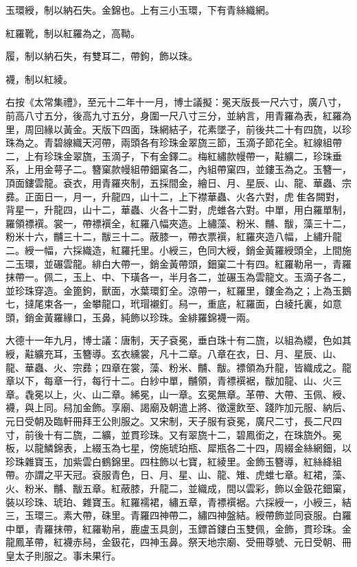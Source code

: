 \begin{pinyinscope}
 玉環綬，制以納石失。金錦也。上有三小玉環，下有青絲織網。



 紅羅靴，制以紅羅為之，高靿。



 履，制以納石失，有雙耳二，帶鉤，飾以珠。



 襪，制以紅綾。



 右按《太常集禮》，至元十二年十一月，博士議擬：冕天版長一尺六寸，廣八寸，前高八寸五分，後高九寸五分，身圍一尺八寸三分，並納言，用青羅為表，紅羅為里，周回緣以黃金。天版下四面，珠網結子，花素墜子，前後共二十有四旒，以珍珠為之。青碧線織天河帶，兩頭各有珍珠金翠旒三節，玉滴子節花全。紅線組帶二，上有珍珠金翠旒，玉滴子，下有金鐸二。梅紅繡款幔帶一，黈纊二，珍珠垂系，上用金萼子二。簪窠款幔組帶鈿窠各二，內組帶窠四，並鏤玉為之。玉簪一，頂面鏤雲龍。袞衣，用青羅夾制，五採間金，繪日、月、星辰、山、龍、華蟲、宗彞。正面日一，月一，升龍四，山十二，上下襟華蟲、火各六對，虎隹各闕對，背星一，升龍四，山十二，華蟲、火各十二對，虎蜼各六對。中單，用白羅單制，羅領褾襈。裳一，帶褾襈全，紅羅八幅夾造。上繡藻、粉米、黼、黻，藻三十二，粉米十六，黼三十二，黻三十二。蔽膝一，帶衣票襈，紅羅夾造八幅，上繡升龍二。綬一幅，六採織造，紅羅托里。小綬三，色同大綬，銷金黃羅綬頭全，上間施二玉環，並碾雲龍。緋白大帶一，銷金黃帶頭，鈿窠二十有四。紅羅勒帛一，青羅抹帶一。佩二，玉上、中、下璜各一，半月各二，並碾玉為雲龍文。玉滴子各二，並珍珠穿造。金篦鉤，獸面，水葉環釘全。涼帶一，紅羅里，鏤金為之；上為玉鵝七，撻尾束各一，金攀龍口，玳瑁襯釘。舄一，重底，紅羅面，白綾托裏，如意頭，銷金黃羅緣口，玉鼻，純飾以珍珠。金緋羅錦襪一兩。



 大德十一年九月，博士議：唐制，天子袞冕，垂白珠十有二旒，以組為纓，色如其綬，黈纊充耳，玉簪導。玄衣纁裳，凡十二章。八章在衣，日、月、星辰、山、龍、華蟲、火、宗彞；四章在裳，藻、粉米、黼、黻。褾領為升龍，皆織成之。龍章以下，每章一行，每行十二。白紗中單，黼領，青褾襈裾，黻加龍、山、火三章。毳冕以上，火、山二章。絺冕，山一章。玄冕無章。革帶、大帶、玉佩、綬、襪，與上同。舄加金飾。享廟、謁廟及朝遣上將、徵還飲至、踐阼加元服、納后、元日受朝及臨軒冊拜王公則服之。又宋制，天子服有袞冕，廣尺二寸，長二尺四寸，前後十有二旒，二纊，並貫珍珠。又有翠旒十二，碧鳳銜之，在珠旒外。冕板，以龍鱗錦表，上綴玉為七星，傍施琥珀瓶、犀瓶各二十四，周綴金絲網鈿，以珍珠雜寶玉，加紫雲白鶴錦里。四柱飾以七寶，紅綾里。金飾玉簪導，紅絲絳組帶。亦謂之平天冠。袞服青色，日、月、星、山、龍、雉、虎蜼七章。紅裙，藻、火、粉米、黼、黻五章。紅蔽膝，升龍二，並織成，間以雲彩，飾以金鈒花鈿窠，裝以珍珠、琥珀、雜寶玉。紅羅襦裙，繡五章，青褾襈裾。六採綬一，小綬三，結三，玉環三。素大帶，硃里。青羅四神帶二，繡四神盤結。綬帶飾並同袞服。白羅中單，青羅抹帶，紅羅勒帛，鹿盧玉具劍，玉鏢首鏤白玉雙佩，金飾，貫珍珠。金龍鳳革帶，紅襪赤舄，金鈒花，四神玉鼻。祭天地宗廟、受冊尊號、元日受朝、冊皇太子則服之。事未果行。




\end{pinyinscope}
